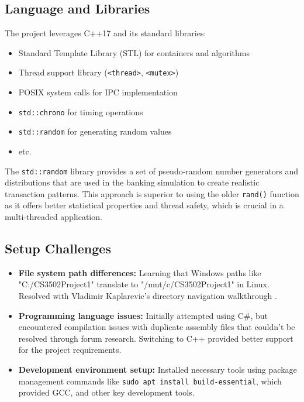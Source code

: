 \documentclass[12pt]{article}
\begin{document}
\subsection{Language and Libraries}
The project leverages C++17 and its standard libraries:

\begin{itemize}
    \item Standard Template Library (STL) for containers and algorithms
    \item Thread support library (\texttt{<thread>}, \texttt{<mutex>})
    \item POSIX system calls for IPC implementation
    \item \texttt{std::chrono} for timing operations
    \item \texttt{std::random} for generating random values \cite{cpp_random}
    \item etc.
\end{itemize}

The \texttt{std::random} library provides a set of pseudo-random number generators and distributions that are used in the banking simulation to create realistic transaction patterns. This approach is superior to using the older \texttt{rand()} function as it offers better statistical properties and thread safety, which is crucial in a multi-threaded application.

\subsection{Setup Challenges}

\begin{itemize}
\item \textbf{File system path differences:} Learning that Windows paths like "C:/CS3502Project1" translate to "/mnt/c/CS3502Project1" in Linux. Resolved with Vladimir Kaplarevic's directory navigation walkthrough \cite{linux_cd}.
    
    \item \textbf{Programming language issues:} Initially attempted using C\#, but encountered compilation issues with duplicate assembly files that couldn't be resolved through forum research. Switching to C++ provided better support for the project requirements.
    
    \item \textbf{Development environment setup:} Installed necessary tools using package management commands like \texttt{sudo apt install build-essential}, which provided GCC, and other key development tools.
    
\end{itemize}
\end{document}
